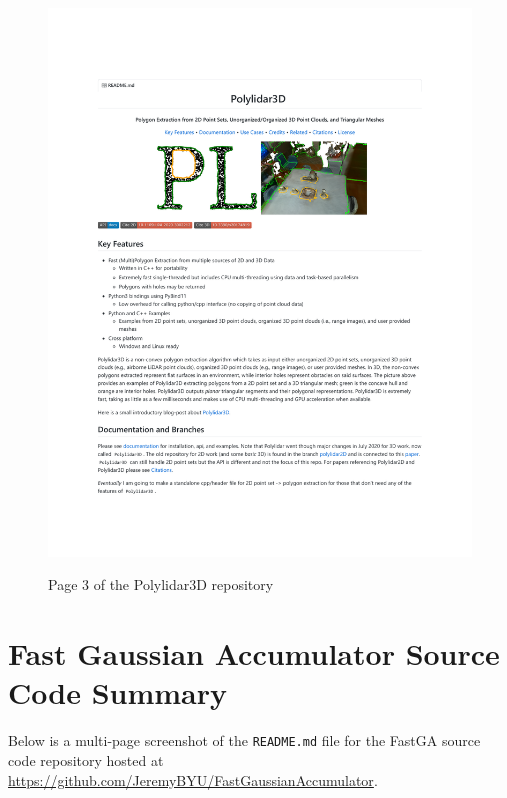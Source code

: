 \begin{figure}[h!]
    \centering\includegraphics[page=3, trim=1.0in 1.0in 1.0in 1.0in, width=.93\linewidth]{appendix_1/imgs/Polylidar3DReadme.pdf}
    \label{fig:apx1_pl3}
    \caption{Page 3 of the Polylidar3D repository} 
\end{figure}

\newpage

\section{Fast Gaussian Accumulator Source Code Summary} 
Below is a multi-page screenshot of the \texttt{README.md} file for the FastGA source code repository hosted at \url{https://github.com/JeremyBYU/FastGaussianAccumulator}.

